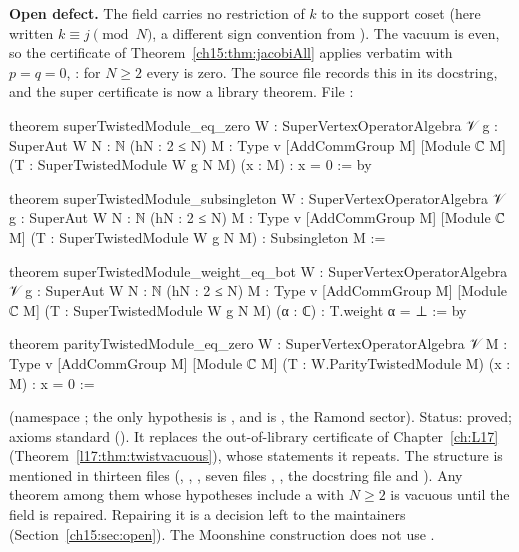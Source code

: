 \begin{warning}
\textbf{Open defect.} The field  carries no restriction of $k$ to the support coset
(here written $k\equiv j\pmod N$, a different sign convention from ). The vacuum
is even, so the certificate of Theorem~\ref{ch15:thm:jacobiAll} applies verbatim with $p=q=0$,
: for $N\ge 2$ every  is zero. The source file
 records this in its docstring, and the
super certificate is now a library theorem. File :
\begin{leancode}
theorem superTwistedModule_eq_zero {W : SuperVertexOperatorAlgebra 𝒱} {g : SuperAut W}
    {N : ℕ} (hN : 2 ≤ N) {M : Type v} [AddCommGroup M] [Module ℂ M]
    (T : SuperTwistedModule W g N M) (x : M) : x = 0 := by

theorem superTwistedModule_subsingleton {W : SuperVertexOperatorAlgebra 𝒱} {g : SuperAut W}
    {N : ℕ} (hN : 2 ≤ N) {M : Type v} [AddCommGroup M] [Module ℂ M]
    (T : SuperTwistedModule W g N M) : Subsingleton M :=

theorem superTwistedModule_weight_eq_bot {W : SuperVertexOperatorAlgebra 𝒱} {g : SuperAut W}
    {N : ℕ} (hN : 2 ≤ N) {M : Type v} [AddCommGroup M] [Module ℂ M]
    (T : SuperTwistedModule W g N M) (α : ℂ) : T.weight α = ⊥ := by

theorem parityTwistedModule_eq_zero {W : SuperVertexOperatorAlgebra 𝒱} {M : Type v}
    [AddCommGroup M] [Module ℂ M] (T : W.ParityTwistedModule M) (x : M) : x = 0 :=
\end{leancode}
(namespace ; the only hypothesis is , and
 is , the Ramond sector).
Status: proved; axioms standard (). It replaces the
out-of-library certificate of Chapter~\ref{ch:L17} (Theorem~\ref{l17:thm:twistvacuous}), whose statements
it repeats. The structure is
mentioned in thirteen files (,
, ,
seven files , , the docstring file
 and ). Any theorem among them
whose hypotheses include a  with $N\ge2$ is vacuous until the field is
repaired. Repairing it is a decision left to the maintainers (Section~\ref{ch15:sec:open}). The
Moonshine construction does not use .
\end{warning}

